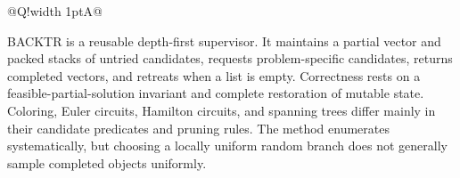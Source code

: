 \documentclass[10pt,letterpaper]{article}
\begin{document}
\begin{longtable}{@{}Q!{\color{Mist}\vrule width 1pt}A@{}}
\end{longtable}
\begin{tcolorbox}[colback=Ink!4,colframe=Ink,title=Cornell summary]
BACKTR is a reusable depth-first supervisor. It maintains a partial vector and packed stacks of untried candidates, requests problem-specific candidates, returns completed vectors, and retreats when a list is empty. Correctness rests on a feasible-partial-solution invariant and complete restoration of mutable state. Coloring, Euler circuits, Hamilton circuits, and spanning trees differ mainly in their candidate predicates and pruning rules. The method enumerates systematically, but choosing a locally uniform random branch does not generally sample completed objects uniformly.
\end{tcolorbox}
\end{document}
